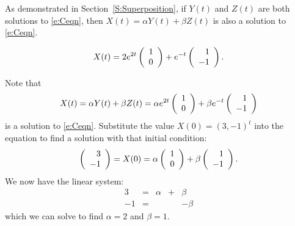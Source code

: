 \documentclass{ximera}
\begin{document}
\begin{exercise}
\begin{solution}
\begin{enumeratea}
\item As demonstrated in Section~\ref{S:Superposition}, if
$Y(t)$ and $Z(t)$ are both solutions to
\eqref{e:Ceqn}, then $X(t) = \alpha Y(t) + \beta Z(t)$ is also
a solution to \eqref{e:Ceqn}.

\item  \ans 
\[
X(t) = 2e^{2t}\left(\begin{array}{r} 1 \\ 0\end{array}\right) + e^{-t}\left(\begin{array}{r} 1 \\ -1\end{array}\right).
\]

\soln Note that
\[ X(t) = \alpha Y(t) + \beta Z(t) = \alpha e^{2t}\left(\begin{array}{r} 1 \\ 0\end{array}\right)
+ \beta e^{-t}\left(\begin{array}{r} 1 \\ -1\end{array}\right) \]
is a solution to \eqref{e:Ceqn}.  Substitute the value
$X(0) = (3,-1)^t$  into the equation to find a solution with that
initial condition:
\[
\left(\begin{array}{r} 3 \\ -1\end{array}\right) = X(0) = \alpha\left(\begin{array}{r} 1 \\ 0\end{array}\right) +
\beta\left(\begin{array}{r} 1 \\ -1\end{array}\right).
\]
We now have the linear system:
\[ \begin{array}{rrrrr}
3 & = & \alpha & + & \beta \\
-1 & = & & & -\beta \end{array} \]
which we can solve to find $\alpha = 2$ and $\beta = 1$.
\end{enumeratea}

\end{solution}
\end{exercise}
\end{document}
